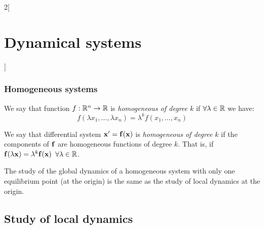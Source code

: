\documentclass[../../../main_math.tex]{subfiles}
\begin{document}
\begin{multicols}{2}[\section{Dynamical systems}]
  \subsubsection{Homogeneous systems}
  \begin{definition}
    We say that function $f:\mathbb{R}^n\rightarrow\mathbb{R}$ is \emph{homogeneous of degree $k$} if $\forall\lambda\in\mathbb{R}$ we have:
    $$f(\lambda x_1,\ldots,\lambda x_n)=\lambda^k f(x_1,\ldots,x_n)$$
  \end{definition}
  \begin{definition}
    We say that differential system $\boldsymbol{\mathrm{x}}'=\boldsymbol{\mathrm{f}}(\boldsymbol{\mathrm{x}})$ is \emph{homogeneous of degree $k$} if the components of $\boldsymbol{\mathrm{f}}$ are homogeneous functions of degree $k$. That is, if $\boldsymbol{\mathrm{f}}(\lambda \boldsymbol{\mathrm{x}})=\lambda^k\boldsymbol{\mathrm{f}}(\boldsymbol{\mathrm{x}})$ $\forall \lambda\in \mathbb{R}$.
  \end{definition}
  \begin{proposition}
    The study of the global dynamics of a homogeneous system with only one equilibrium point (at the origin) is the same as the study of local dynamics at the origin.
  \end{proposition}
  \subsection{Study of local dynamics}

\end{multicols}
\end{document}
